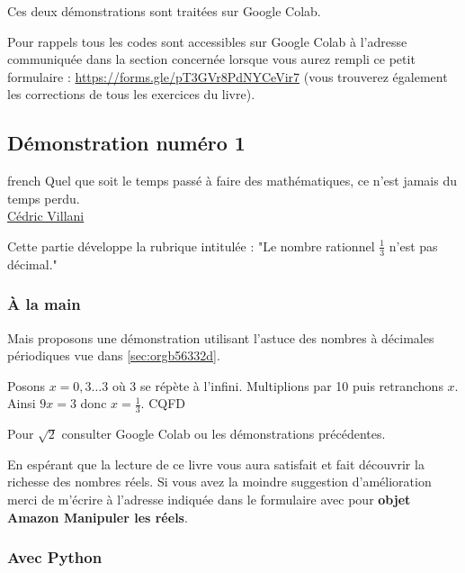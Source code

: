 \documentclass[a4paper, 11pt, twoside]{article}
\begin{document}
Ces deux démonstrations sont traitées sur Google Colab.

Pour rappels tous les codes sont accessibles sur Google Colab à
l'adresse communiquée dans la section concernée lorsque vous
aurez rempli ce petit formulaire :
\url{https://forms.gle/pT3GVr8PdNYCeVir7} (vous trouverez également
les corrections de tous les exercices du livre).
\stopcontents[level-2]

\subsection{Démonstration numéro 1}
\label{sec:org92ac15a}

\begin{foreigndisplayquote}{french}
Quel que soit le temps passé à faire des mathématiques, ce n'est
jamais du temps perdu.\\

\href{https://fr.wikipedia.org/wiki/C\%C3\%A9dric\_Villani}{Cédric Villani}
\end{foreigndisplayquote}

\startcontents[level-2]

Cette partie développe la rubrique intitulée : "Le nombre
rationnel \(\frac{1}{3}\) n'est pas décimal."

\subsubsection{À la main}
\label{sec:orgac9f2fa}

Mais proposons une démonstration utilisant l'astuce des nombres à
décimales périodiques vue dans \ref{sec:orgb56332d}.

Posons \(x = 0,3\dots 3\) où 3 se répète à l'infini. Multiplions par
10 puis retranchons \(x\). Ainsi \(9x = 3\) donc \(x = \frac{1}{3}\). CQFD

Pour \(\sqrt{2}\) consulter Google Colab ou les démonstrations
précédentes.

En espérant que la lecture de ce livre vous aura satisfait et fait
découvrir la richesse des nombres réels. Si vous avez la moindre
suggestion d'amélioration merci de m'écrire à l'adresse
indiquée dans le formulaire avec pour \textbf{objet Amazon Manipuler les réels}.

\subsubsection{Avec Python}
\label{sec:org2837c0b}
\end{document}
